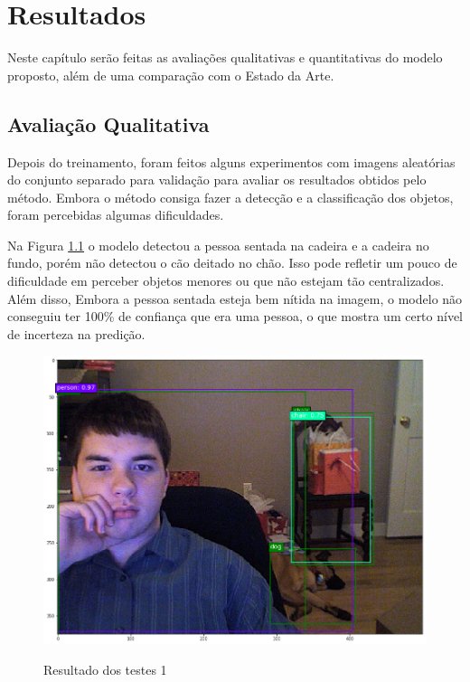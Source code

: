 \chapter{Resultados}
\label{cap:5}
\vspace{-1.9cm}

Neste capítulo serão feitas as avaliações qualitativas e quantitativas do modelo proposto, além de uma comparação com o Estado da Arte.

\section{Avaliação Qualitativa}
\label{secao:5:1:2}

Depois do treinamento, foram feitos alguns experimentos com imagens aleatórias do conjunto separado para validação para avaliar os resultados obtidos pelo método. Embora o método consiga fazer a detecção e a classificação dos objetos, foram percebidas algumas dificuldades.

Na Figura \ref{fig:teste_1} o modelo detectou a pessoa sentada na cadeira e a cadeira no fundo, porém não detectou o cão deitado no chão. Isso pode refletir um pouco de dificuldade em perceber objetos menores ou que não estejam tão centralizados. Além disso, Embora a pessoa sentada esteja bem nítida na imagem, o modelo não conseguiu ter 100\% de confiança que era uma pessoa, o que mostra um certo nível de incerteza na predição.

\begin{figure}[H]
	\setlength{\abovecaptionskip}{0pt}
	\setlength{\belowcaptionskip}{0pt}
	\caption[Resultado dos testes 1]{Resultado dos testes 1}
	\centering
	\includegraphics[width=.6\textwidth]{imagem/test_image_5.png}
	\captionsetup{justification=centering}
	\label{fig:teste_1}
\end{figure}

